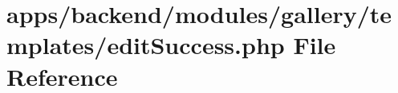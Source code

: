 \hypertarget{backend_2modules_2gallery_2templates_2edit_success_8php}{\section{apps/backend/modules/gallery/templates/edit\-Success.php File Reference}
\label{backend_2modules_2gallery_2templates_2edit_success_8php}
}
